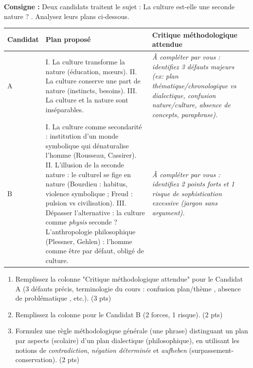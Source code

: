 \documentclass[11pt]{article}
\begin{document}
\begin{exercice}
\textbf{Consigne :} Deux candidats traitent le sujet : \og La culture est-elle une seconde nature ? \fg. Analysez leurs plans ci-dessous.

\begin{tabularx}{\linewidth}{>{\hsize=1.2\hsize}X >{\hsize=1.8\hsize}X >{\hsize=1.8\hsize}X}
\hline
\textbf{Candidat} & \textbf{Plan proposé} & \textbf{Critique méthodologique attendue} \\
\hline
A & I. La culture transforme la nature (éducation, mœurs). 
II. La culture conserve une part de nature (instincts, besoins). 
III. La culture et la nature sont inséparables. & \textit{À compléter par vous : identifiez 3 défauts majeurs (ex: plan thématique/chronologique vs dialectique, confusion nature/culture, absence de concepts, paraphrase).} \\
\hline
B & I. La culture comme secondarité : institution d'un monde symbolique qui dénaturalise l'homme (Rousseau, Cassirer). 
II. L'illusion de la seconde nature : le culturel se fige en nature (Bourdieu : habitus, violence symbolique ; Freud : pulsion vs civilisation). 
III. Dépasser l'alternative : la culture comme \textit{physis} seconde ? L'anthropologie philosophique (Plessner, Gehlen) : l'homme comme être par défaut, obligé de culture. & \textit{À compléter par vous : identifiez 2 points forts et 1 risque de sophistication excessive (jargon sans argument).} \\
\hline
\end{tabularx}

\begin{enumerate}
    \item Remplissez la colonne "Critique méthodologique attendue" pour le Candidat A (3 défauts précis, terminologie du cours : \og confusion plan/thème \fg, \og absence de problématique \fg, etc.). (3 pts)
    \item Remplissez la colonne pour le Candidat B (2 forces, 1 risque). (2 pts)
    \item Formulez une règle méthodologique générale (une phrase) distinguant un \og plan par aspects \fg (scolaire) d'un \og plan dialectique \fg (philosophique), en utilisant les notions de \textit{contradiction}, \textit{négation déterminée} et \textit{aufheben} (surpassement-conservation). (2 pts)
\end{enumerate}
\end{exercice}
\end{document}
